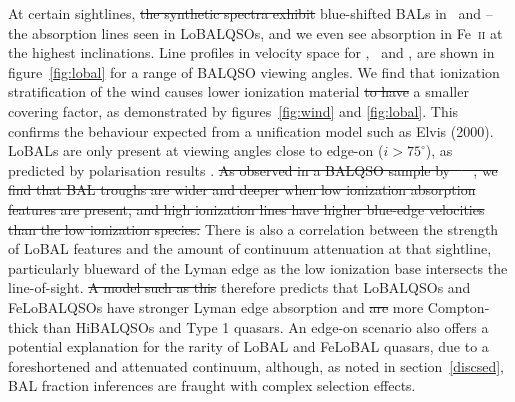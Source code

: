 \documentclass[preprint, a4paper, 11pt]{aastex}
\providecommand{\DIFadd}[1]{{\protect\color{blue}\uwave{#1}}} %
\providecommand{\DIFdel}[1]{{\protect\color{red}\sout{#1}}}                      %
\providecommand{\DIFaddbegin}{} %
\providecommand{\DIFaddend}{} %
\providecommand{\DIFdelbegin}{} %
\providecommand{\DIFdelend}{} %
\begin{document}
At certain sightlines, \DIFdelbegin \DIFdel{the synthetic spectra exhibit }\DIFdelend \DIFaddbegin \DIFadd{our model now produces }\DIFaddend blue-shifted BALs in \al\ and \mg --
the absorption lines seen in LoBALQSOs, and we even see absorption in Fe~\textsc{ii}
at the highest inclinations. Line profiles in velocity space 
for \civ, \al\ and \mg, are shown in figure~\ref{fig:lobal} for a range
of BALQSO viewing angles. We find that ionization stratification
of the wind causes lower ionization material \DIFdelbegin \DIFdel{to have }\DIFdelend \DIFaddbegin \DIFadd{has }\DIFaddend a smaller covering factor, 
as demonstrated by figures~\ref{fig:wind} and \ref{fig:lobal}.
This confirms the behaviour expected from a unification model such as Elvis (2000). 
LoBALs are only present at viewing angles close to edge-on ($i>75^\circ$),
as predicted by polarisation results \citep{brotherton1997}.
\DIFdelbegin \DIFdel{As observed in a BALQSO sample by \mbox{%
\cite{filizak2014}
}%
, we find that
BAL troughs are wider and deeper when low ionization absorption features are present,
and high ionization lines have higher blue-edge velocities than the 
low ionization species.
}\DIFdelend There is also a correlation between the strength of LoBAL features
and the amount of continuum attenuation at that sightline, particularly
blueward of the Lyman edge as the low ionization base 
intersects the line-of-sight. 
\DIFdelbegin \DIFdel{A model such as this }\DIFdelend \DIFaddbegin \DIFadd{Our model }\DIFaddend therefore predicts that LoBALQSOs and FeLoBALQSOs 
have stronger Lyman edge absorption and 
\DIFdelbegin \DIFdel{are }\DIFdelend \DIFaddbegin \DIFadd{be }\DIFaddend more Compton-thick than HiBALQSOs and Type 1 quasars.
An edge-on scenario also offers a potential explanation for the rarity of LoBAL and
FeLoBAL quasars, due to a foreshortened and attenuated continuum, 
although, as noted in section~\ref{discsed}, BAL fraction 
inferences are fraught with complex selection effects.



\DIFdelbegin %
\end{document}
